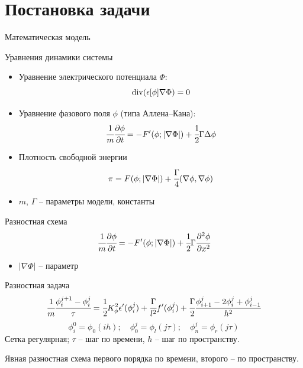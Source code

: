 
\section{Постановка задачи}

\begin{frame}{Математическая модель}
\vspace{-0.3cm}
\begin{block}{Уравнения динамики системы}
	\begin{itemize}
		\item Уравнение электрического потенциала $\Phi$:
		\[
			\operatorname{{div}}(\epsilon[\phi] \nabla \Phi) = 0
		\]
		\item Уравнение фазового поля $\phi$ (типа Аллена--Кана):
		\[
			\cfrac{1}{m} \cfrac{\partial \phi}{\partial t} = -F'(\phi; |\nabla \Phi|) + \cfrac{1}{2} \Gamma \Delta \phi
		\]
	\end{itemize}
\end{block}
\begin{itemize}
	\item Плотность свободной энергии
	\vspace{-0.2cm}
	\[
		\pi = F(\phi; |\nabla \Phi|) + \cfrac{\Gamma}{4} (\nabla \phi, \nabla \phi)
	\]
	\item $m$, $\Gamma$ -- параметры модели, константы
\end{itemize}
\end{frame}


\begin{frame}{Разностная схема}
\vspace{-0.9cm}
\[
	\cfrac{1}{m} \cfrac{\partial \phi}{\partial t} = -F'(\phi; |\nabla \Phi|) + \cfrac{1}{2} \Gamma \cfrac{\partial^2 \phi}{\partial x^2}
\]
\vspace{-0.4cm}
\begin{itemize}
	\item $|\nabla \Phi|$ -- параметр
\end{itemize}
\begin{block}{Разностная задача}
	\[
		\cfrac{1}{m} \cfrac{\phi_i^{j + 1} - \phi_i^j}{\tau} = \cfrac{1}{2} K_\phi^2 \epsilon'(\phi_i^j) + \cfrac{\Gamma}{l^2} f'(\phi_i^j) + \cfrac{\Gamma}{2} \cfrac{\phi_{i + 1}^j - 2 \phi_i^j + \phi_{i - 1}^j}{h^2}
	\]
	\[\phi_i^0 = \phi_0(ih); \quad \phi_0^j = \phi_l(j \tau); \quad \phi_n^j = \phi_r(j \tau)\]
	Сетка регулярная; $\tau$ -- шаг по времени, $h$ -- шаг по пространству.
\end{block}
Явная разностная схема первого порядка по времени, второго -- по пространству.
\end{frame}


